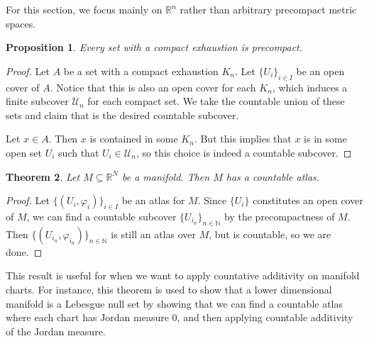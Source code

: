 \documentclass{article}
\theoremstyle{plain} %
\newtheorem{thm}{Theorem}
\numberwithin{thm}{section} %
\newtheorem{prop}[thm]{Proposition}
\theoremstyle{definition}
\begin{document}
    For this section, we focus mainly on \(\mathbb{R}^n\) rather than arbitrary precompact metric spaces.
    \begin{prop}
        Every set with a compact exhaustion is precompact.
    \end{prop}
    \begin{proof}
        Let \(A\) be a set with a compact exhaustion \(K_n\). Let \(\{ U_i \} _{i \in I}\) be an open cover of \(A\). Notice that this is also an open cover for each \(K_n\), which induces a finite subcover \(\mathcal{U}_n\) for each compact set. We take the countable union of these sets and claim that is the desired countable subcover.

        Let \(x \in A\). Then \(x\) is contained in some \(K_n\). But this implies that \(x\) is in some open set \(U_i\) such that \(U_i \in \mathcal{U}_n\), so this choice is indeed a countable subcover.
    \end{proof}
    \begin{thm}
        Let \(M \subseteq \mathbb{R}^N\) be a manifold. Then \(M\) has a countable atlas.
    \end{thm}
    \begin{proof}
        Let \(\{ (U_i , \varphi _i) \}_{i \in I}\) be an atlas for \(M\). Since \(\{ U_i \}\) constitutes an open cover of \(M\), we can find a countable subcover \(\{ U_{i_n} \}_{n \in \mathbb{N}}\) by the precompactness of \(M\). Then \(\{ (U_{i_n}, \varphi _{i_n}) \}_{n \in \mathbb{N}}\) is still an atlas over \(M\), but is countable, so we are done.
    \end{proof}
    This result is useful for when we want to apply countative additivity on manifold charts. For instance, this theorem is used to show that a lower dimensional manifold is a Lebesgue null set by showing that we can find a countable atlas where each chart has Jordan measure 0, and then applying countable additivity of the Jordan measure.
\end{document}
